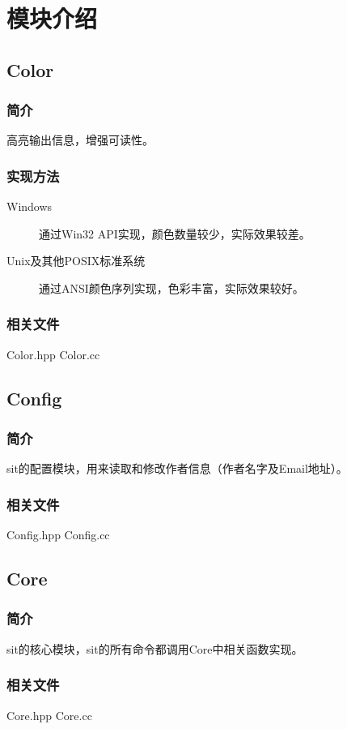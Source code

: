 \documentclass[11pt, a4paper, UTF8]{ctexart}
\begin{document}
\section{模块介绍}

\subsection{Color}
\subsubsection{简介}
高亮输出信息，增强可读性。
\subsubsection{实现方法}
\begin{description}
	\item[Windows] 通过Win32 API实现，颜色数量较少，实际效果较差。
	\item[Unix及其他POSIX标准系统] 通过ANSI颜色序列实现，色彩丰富，实际效果较好。
\end{description}
\subsubsection{相关文件}
Color.hpp Color.cc

\subsection{Config}
\subsubsection{简介}
sit的配置模块，用来读取和修改作者信息（作者名字及Email地址）。
\subsubsection{相关文件}
Config.hpp Config.cc

\subsection{Core}
\subsubsection{简介}
sit的核心模块，sit的所有命令都调用Core中相关函数实现。
\subsubsection{相关文件}
Core.hpp Core.cc
\end{document}
